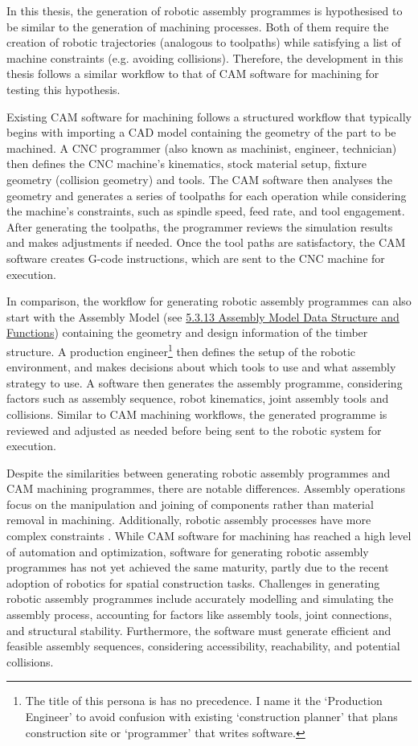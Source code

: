 In this thesis, the generation of robotic assembly programmes is hypothesised to be similar to the generation of machining processes. Both of them require the creation of robotic trajectories (analogous to toolpaths) while satisfying a list of machine constraints (e.g. avoiding collisions). Therefore, the development in this thesis follows a similar workflow to that of CAM software for machining for testing this hypothesis.

Existing CAM software for machining follows a structured workflow that typically begins with importing a CAD model containing the geometry of the part to be machined. A CNC programmer (also known as machinist, engineer, technician) then defines the CNC machine’s kinematics, stock material setup, fixture geometry (collision geometry) and tools. The CAM software then analyses the geometry and generates a series of toolpaths for each operation while considering the machine's constraints, such as spindle speed, feed rate, and tool engagement. After generating the toolpaths, the programmer reviews the simulation results and makes adjustments if needed. Once the tool paths are satisfactory, the CAM software creates G-code instructions, which are sent to the CNC machine for execution.

In comparison, the workflow for generating robotic assembly programmes can also start with the Assembly Model (see \ul{5.3.13 Assembly Model Data Structure and Functions}) containing the geometry and design information of the timber structure. A production engineer\footnote{ The title of this persona is has no precedence. I name it the ‘Production Engineer’ to avoid confusion with existing ‘construction planner’ that plans construction site or ‘programmer’ that writes software.} then defines the setup of the robotic environment, and makes decisions about which tools to use and what assembly strategy to use. A software then generates the assembly programme, considering factors such as assembly sequence, robot kinematics, joint assembly tools and collisions. Similar to CAM machining workflows, the generated programme is reviewed and adjusted as needed before being sent to the robotic system for execution.

Despite the similarities between generating robotic assembly programmes and CAM machining programmes, there are notable differences. Assembly operations focus on the manipulation and joining of components rather than material removal in machining. Additionally, robotic assembly processes have more complex constraints \parencite{wangStateArtComputational2021}. While CAM software for machining has reached a high level of automation and optimization, software for generating robotic assembly programmes has not yet achieved the same maturity, partly due to the recent adoption of robotics for spatial construction tasks. Challenges in generating robotic assembly programmes include accurately modelling and simulating the assembly process, accounting for factors like assembly tools, joint connections, and structural stability. Furthermore, the software must generate efficient and feasible assembly sequences, considering accessibility, reachability, and potential collisions.

